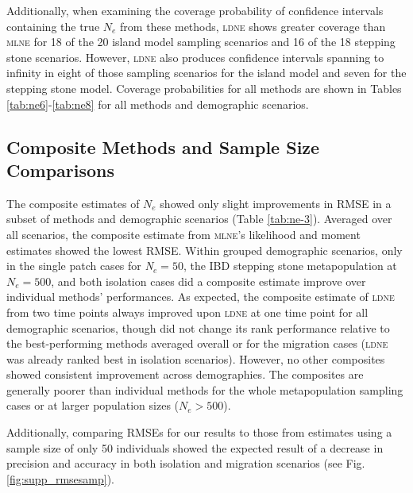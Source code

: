 Additionally, when examining the coverage probability of confidence intervals containing the true 
$N_e$ from these methods, \textsc{ldne} shows greater coverage than \textsc{mlne} for 18 of the 20 
island model sampling scenarios and 16 of the 18 stepping stone scenarios. However, \textsc{ldne} also 
produces confidence intervals spanning to infinity in eight of those sampling scenarios for the island 
model and seven for the stepping stone model. Coverage probabilities for all methods are shown in 
Tables \ref{tab:ne6}-\ref{tab:ne8} for all methods and demographic scenarios.

\subsection{Composite Methods and Sample Size Comparisons}
The composite estimates of $N_e$ showed only slight improvements in RMSE in a subset of 
methods and demographic scenarios (Table \ref{tab:ne-3}). Averaged over all scenarios, the composite estimate from 
\textsc{mlne}'s likelihood and moment estimates showed the lowest RMSE. Within grouped demographic 
scenarios, only in the single patch cases for \emph{N}$_e = 50$, the IBD stepping stone metapopulation 
at $N_e = 500$, and both isolation cases did a composite estimate improve over individual methods' 
performances. As expected, the composite estimate of \textsc{ldne} from two time points always improved upon 
\textsc{ldne} at one time point for all demographic scenarios, though did not change its rank performance 
relative to the best-performing methods averaged overall or for the migration cases (\textsc{ldne} was 
already ranked best in isolation scenarios). However, no other composites showed consistent improvement 
across demographies. The composites are generally poorer than individual methods for the whole 
metapopulation sampling cases or at larger population sizes ($N_e > 500$).

Additionally, comparing RMSEs for our results to those from estimates using a sample size of only 50 
individuals showed the expected result of a decrease in precision and accuracy in both isolation and 
migration scenarios (see Fig. \ref{fig:supp_rmsesamp}).


